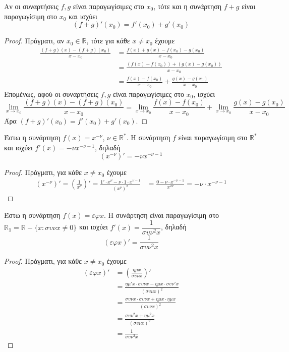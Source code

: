 \documentclass[a4paper, 12pt]{article}
\begin{document}
\begin{theorem}{}
  Αν οι συναρτήσεις $f,g$ είναι παραγωγίσιμες στο $x_0$, τότε και η συνάρτηση $f+g$ είναι παραγωγίσιμη στο $x_0$ και ισχύει
  $$(f+g)'(x_0)=f'(x_0)+g'(x_0)$$
\end{theorem}
\begin{proof}
  Πράγματι, αν $x_0\in\mathbb{R}$, τότε για κάθε $x\ne x_0$ έχουμε
  \begin{align*}
    \frac{(f+g)(x)-(f+g)(x_0)}{x-x_0} & =\frac{f(x)+g(x)-f(x_0)-g(x_0)}{x-x_0}               \\
                                      & =\frac{(f(x)-f(x_0))+(g(x)-g(x_0))}{x-x_0}           \\
                                      & =\frac{f(x)-f(x_0)}{x-x_0}+\frac{g(x)-g(x_0)}{x-x_0}
  \end{align*}
  Επομένως, αφού οι συναρτήσεις $f,g$ είναι παραγωγίσιμες στο $x_0$, ισχύει
  $$\lim_{x\to x_0}\frac{(f+g)(x)-(f+g)(x_0)}{x-x_0}=\lim_{x\to x_0}\frac{f(x)-f(x_0)}{x-x_0}+\lim_{x\to x_0}\frac{g(x)-g(x_0)}{x-x_0}$$
  Άρα $(f+g)'(x_0)=f'(x_0)+g'(x_0)$.
\end{proof}

\begin{theorem}{}
  Έστω η συνάρτηση $f(x)=x^{-ν}$, $ν\in\mathbb{R}^*$. Η συνάρτηση $f$ είναι παραγωγίσιμη στο $\mathbb{R}^*$ και ισχύει $f'(x)=-νx^{-ν-1}$, δηλαδή
  $$(x^{-ν})'=-νx^{-ν-1}$$
\end{theorem}
\begin{proof}
  Πράγματι, για κάθε $x\ne x_0$ έχουμε
  \begin{align*}
    (x^{-ν})'=\left( \frac{1}{x^ν} \right)'=\frac{1'\cdot x^{ν}-ν\cdot 1\cdot x^{ν-1}}{(x^ν)^2} & =\frac{0-ν \cdot x^{-ν-1}}{x^{2ν}}=-ν\cdot x^{-ν-1}
  \end{align*}
\end{proof}

\begin{theorem}{}
  Έστω η συνάρτηση $f(x)=εφx$. Η συνάρτηση είναι παραγωγίσιμη στο $\mathbb{R_1}=\mathbb{R}-\{x:συνx\ne 0\}$ και ισχύει $f'(x)=\dfrac{1}{συν^2x}$, δηλαδή
  $$(εφx)'=\frac{1}{συν^2x}$$
\end{theorem}
\begin{proof}
  Πράγματι, για κάθε $x\ne x_0$ έχουμε
  \begin{align*}
    (εφx)' & =\left( \frac{ημx}{συνx}\right)'                \\
           & =\frac{ημ'x\cdot συνx-ημx\cdot συν'x}{(συνx)^2} \\
           & =\frac{συνx\cdot συνx+ημx\cdot ημx}{(συνx)^2}   \\
           & =\frac{συν^2x+ημ^2x}{(συνx)^2}                  \\
           & =\frac{1}{συν^2x}
  \end{align*}
\end{proof}
\end{document}
